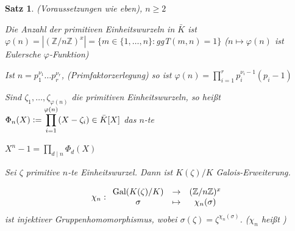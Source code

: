 \documentclass[a4paper,10pt,german]{scrbook}
\theoremstyle{saetze}
\newtheorem{Satz}{Satz}
\theoremstyle{definitionen}
\begin{document}
\begin{Satz}
(Voraussetzungen wie eben), $n \geq 2$
\begin{enum}
\item Die Anzahl der primitiven Einheitswurzeln in $\bar K$ ist
$\varphi(n) = |(\mathbb{Z}/n\mathbb{Z})^x| = \{ m\in \{1,\dots,n\} :
$ggT$(m,n) = 1\}$ ($n \mapsto \varphi(n)$ ist Eulersche
$\varphi$-Funktion)


\item Ist $n = p_1^{\nu_1} \dots p_r^{\nu_r}$,
(Primfaktorzerlegung) so ist $\varphi(n) = \displaystyle \prod_{i=1}^r
p_i^{\nu_i-1} (p_i - 1)$


\item Sind $\zeta_1,\dots,\zeta_{\varphi(n)}$ die primitiven
Einheitswurzeln, so heißt $\Phi_n(X) \mathrel{\mathop:}=
\displaystyle \prod_{i=1}^{\varphi(n)} (X- \zeta_i) \in \bar K[X]$ das $n$-te

\item $X^n - 1 = \displaystyle \prod_{d \mid n} \Phi_d(X)$


\item Sei $\zeta$ primitive $n$-te Einheitswurzel. Dann ist
$K(\zeta)/K$ Galois-Erweiterung.

\item \[\chi_n: \begin{array}{ccc} \mbox{Gal}(K(\zeta)/K) &\rightarrow
&(\mathbb{Z}/n\mathbb{Z})^x \\ \sigma &\mapsto &\chi_n(\sigma)
\end{array}\] ist injektiver Gruppenhomomorphismus, wobei
\newline $\sigma(\zeta) = \zeta^{\chi_n(\sigma)}$. ($\chi_n$ heißt
)


\end{enum}
\end{Satz}
\end{document}
